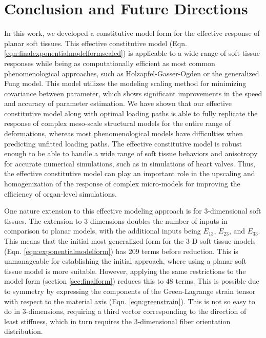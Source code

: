 \section{Conclusion and Future Directions} 

	In this work, we developed a constitutive model form for the effective response of planar soft tissues. This effective constitutive model (Eqn. \ref{eqn:finalexponentialmodelformscaled}) is applicable to a wide range of soft tissue responses while being as computationally efficient as most common phenomenological approaches, such as Holzapfel-Gasser-Ogden or the generalized Fung model. This model utilizes the modeling scaling method for minimizing covariance between parameter, which shows significant improvements in the speed and accuracy of parameter estimation. We have shown that our effective constitutive model along with optimal loading paths is able to fully replicate the response of complex meso-scale structural models for the entire range of deformations, whereas most phenomenological models have difficulties when predicting unfitted loading paths. The effective constitutive model is robust enough to be able to handle a wide range of soft tissue behaviors and anisotropy for accurate numerical simulations, such as in simulations of heart valves. Thus, the effective constitutive model can play an important role in the upscaling and homogenization of the response of complex micro-models for improving the efficiency of organ-level simulations. 
    

    One nature extension to this effective modeling approach is for 3-dimensional soft tissues. The extension to 3 dimensions doubles the number of inputs in comparison to planar models, with the additional inputs being $E_{13}$, $E_{23}$, and $E_{33}$. This means that the initial most generalized form for the 3-D soft tissue models (Eqn. \ref{eqn:exponentialmodelform}) has 209 terms before reduction. This is unmanageable for establishing the initial approach, where using a planar soft tissue model is more suitable. However, applying the same restrictions to the model form (section \ref{sec:finalform}) reduces this to 48 terms. This is possible due to symmetry by expressing the components of the Green-Lagrange strain tensor with respect to the material axis (Eqn. \ref{eqn:greenstrain}). This is not so easy to do in 3-dimensions, requiring a third vector corresponding to the direction of least stiffness, which in turn requires the 3-dimensional fiber orientation distribution. 
    
    
    
    
    
    
    
    
